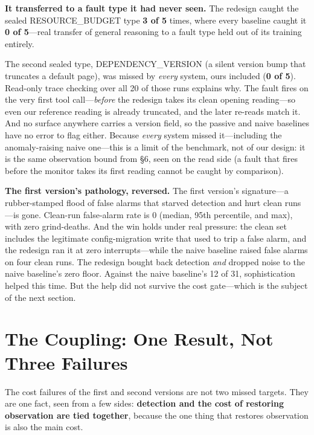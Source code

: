 \documentclass[acmsmall,screen]{acmart}
\begin{document}
\textbf{It transferred to a fault type it had never seen.} The redesign caught
the sealed RESOURCE\_BUDGET type \textbf{3 of 5} times, where every baseline
caught it \textbf{0 of 5}---real transfer of general reasoning to a fault type
held out of its training entirely.

The second sealed type, DEPENDENCY\_VERSION (a silent version bump that
truncates a default page), was missed by \emph{every} system, ours included
(\textbf{0 of 5}). Read-only trace checking over all 20 of those runs explains
why. The fault fires on the very first tool call---\emph{before} the redesign
takes its clean opening reading---so even our reference reading is already
truncated, and the later re-reads match it. And no surface anywhere carries a
version field, so the passive and naive baselines have no error to flag either.
Because \emph{every} system missed it---including the anomaly-raising naive
one---this is a limit of the benchmark, not of our design: it is the same
observation bound from \S6, seen on the read side (a fault that fires before the
monitor takes its first reading cannot be caught by comparison).

\textbf{The first version's pathology, reversed.} The first version's
signature---a rubber-stamped flood of false alarms that starved detection and
hurt clean runs---is gone. Clean-run false-alarm rate is 0 (median, 95th
percentile, and max), with zero grind-deaths. And the win holds under real
pressure: the clean set includes the legitimate config-migration write that used
to trip a false alarm, and the redesign ran it at zero interrupts---while the
naive baseline raised false alarms on four clean runs. The redesign bought back
detection \emph{and} dropped noise to the naive baseline's zero floor. Against
the naive baseline's 12 of 31, sophistication helped this time. But the help did
not survive the cost gate---which is the subject of the next section.

\section{The Coupling: One Result, Not Three Failures}
The cost failures of the first and second versions are not two missed targets.
They are one fact, seen from a few sides: \textbf{detection and the cost of
restoring observation are tied together}, because the one thing that restores
observation is also the main cost.
\end{document}
